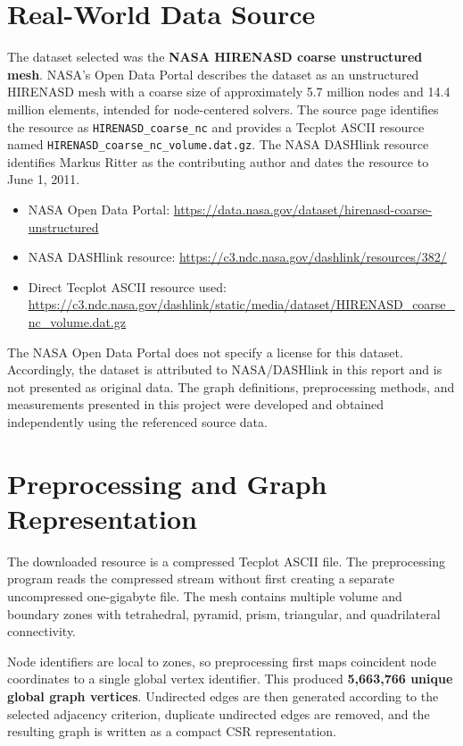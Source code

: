 \documentclass[11pt]{article}
\begin{document}
\section{Real-World Data Source}
The dataset selected was the \textbf{NASA HIRENASD coarse unstructured mesh}. NASA's Open Data Portal describes the dataset as an unstructured HIRENASD mesh with a coarse size of approximately 5.7 million nodes and 14.4 million elements, intended for node-centered solvers. The source page identifies the resource as \texttt{HIRENASD\_coarse\_nc} and provides a Tecplot ASCII resource named \texttt{HIRENASD\_coarse\_nc\_volume.dat.gz}. The NASA DASHlink resource identifies Markus Ritter as the contributing author and dates the resource to June 1, 2011.

\begin{itemize}
    \item NASA Open Data Portal: \url{https://data.nasa.gov/dataset/hirenasd-coarse-unstructured}
    \item NASA DASHlink resource: \url{https://c3.ndc.nasa.gov/dashlink/resources/382/}
    \item Direct Tecplot ASCII resource used: \url{https://c3.ndc.nasa.gov/dashlink/static/media/dataset/HIRENASD_coarse_nc_volume.dat.gz}
\end{itemize}

The NASA Open Data Portal does not specify a license for this dataset. Accordingly, the dataset is attributed to NASA/DASHlink in this report and is not presented as original data. The graph definitions, preprocessing methods, and measurements presented in this project were developed and obtained independently using the referenced source data.

\section{Preprocessing and Graph Representation}
The downloaded resource is a compressed Tecplot ASCII file. The preprocessing program reads the compressed stream without first creating a separate uncompressed one-gigabyte file. The mesh contains multiple volume and boundary zones with tetrahedral, pyramid, prism, triangular, and quadrilateral connectivity.

Node identifiers are local to zones, so preprocessing first maps coincident node coordinates to a single global vertex identifier. This produced \textbf{5,663,766 unique global graph vertices}. Undirected edges are then generated according to the selected adjacency criterion, duplicate undirected edges are removed, and the resulting graph is written as a compact CSR representation.
\end{document}
